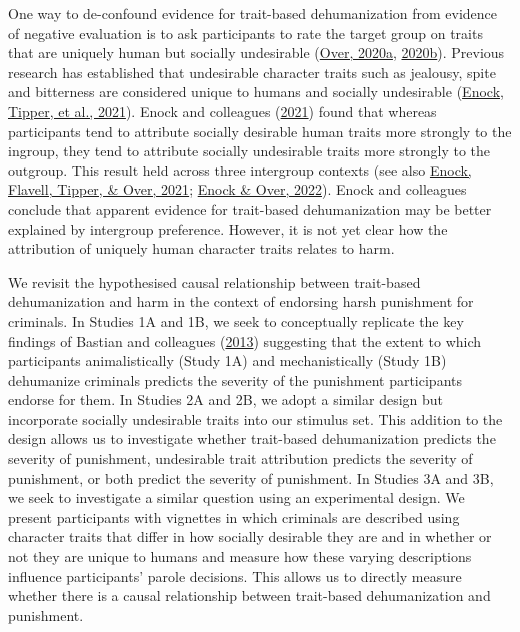 \documentclass[
]{article}
\begin{document}
One way to de-confound evidence for trait-based dehumanization from evidence of negative evaluation is to ask participants to rate the target group on traits that are uniquely human but socially undesirable (\protect\hyperlink{ref-Over2020a}{Over, 2020a}, \protect\hyperlink{ref-Over2020b}{2020b}). Previous research has established that undesirable character traits such as jealousy, spite and bitterness are considered unique to humans and socially undesirable (\protect\hyperlink{ref-Enock2021a}{Enock, Tipper, et al., 2021}). Enock and colleagues (\protect\hyperlink{ref-Enock2021a}{2021}) found that whereas participants tend to attribute socially desirable human traits more strongly to the ingroup, they tend to attribute socially undesirable traits more strongly to the outgroup. This result held across three intergroup contexts (see also \protect\hyperlink{ref-Enock2021b}{Enock, Flavell, Tipper, \& Over, 2021}; \protect\hyperlink{ref-Enock2022}{Enock \& Over, 2022}). Enock and colleagues conclude that apparent evidence for trait-based dehumanization may be better explained by intergroup preference. However, it is not yet clear how the attribution of uniquely human character traits relates to harm.

We revisit the hypothesised causal relationship between trait-based dehumanization and harm in the context of endorsing harsh punishment for criminals. In Studies 1A and 1B, we seek to conceptually replicate the key findings of Bastian and colleagues (\protect\hyperlink{ref-Bastian2013}{2013}) suggesting that the extent to which participants animalistically (Study 1A) and mechanistically (Study 1B) dehumanize criminals predicts the severity of the punishment participants endorse for them. In Studies 2A and 2B, we adopt a similar design but incorporate socially undesirable traits into our stimulus set. This addition to the design allows us to investigate whether trait-based dehumanization predicts the severity of punishment, undesirable trait attribution predicts the severity of punishment, or both predict the severity of punishment. In Studies 3A and 3B, we seek to investigate a similar question using an experimental design. We present participants with vignettes in which criminals are described using character traits that differ in how socially desirable they are and in whether or not they are unique to humans and measure how these varying descriptions influence participants' parole decisions. This allows us to directly measure whether there is a causal relationship between trait-based dehumanization and punishment.
\end{document}
